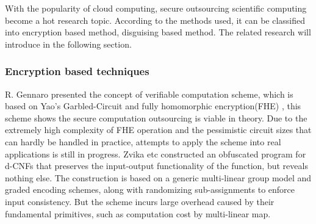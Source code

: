 \documentclass[runningheads,a4paper]{llncs}
\begin{document}
With the popularity of cloud computing, secure outsourcing scientific computing become a hot research topic.
According to the methods used, it can be classified into encryption based method, disguising based method.
The related research will introduce in the following section.
\subsubsection{Encryption based techniques}
R. Gennaro \cite{t16}presented the concept of verifiable computation scheme, which is based on Yao’s Garbled-Circuit\cite{t38} and fully homomorphic encryption(FHE)\cite{t15} , this scheme shows the secure computation outsourcing is viable in theory. Due to the extremely high complexity of FHE operation and the pessimistic circuit sizes that can hardly be handled in practice, attempts to apply the scheme into real applications is still in progress.
Zvika \cite{t10}etc constructed an obfuscated program for d-CNFs that preserves the input-output functionality of the function, but reveals nothing else. The construction is based on a generic multi-linear group model and graded encoding schemes, along with randomizing sub-assignments to enforce input consistency. But the scheme incurs large overhead caused by their fundamental primitives, such as computation cost by multi-linear map.
\end{document}
